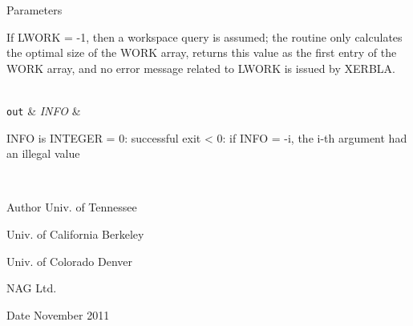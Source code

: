 \begin{DoxyParams}[1]{Parameters}
\begin{DoxyVerb}
          If LWORK = -1, then a workspace query is assumed; the routine
          only calculates the optimal size of the WORK array, returns
          this value as the first entry of the WORK array, and no error
          message related to LWORK is issued by XERBLA.\end{DoxyVerb}
\\
\hline
\mbox{\tt out}  & {\em I\+N\+F\+O} & \begin{DoxyVerb}          INFO is INTEGER
          = 0:  successful exit
          < 0:  if INFO = -i, the i-th argument had an illegal value\end{DoxyVerb}
 \\
\hline
\end{DoxyParams}
\begin{DoxyAuthor}{Author}
Univ. of Tennessee 

Univ. of California Berkeley 

Univ. of Colorado Denver 

N\+A\+G Ltd. 
\end{DoxyAuthor}
\begin{DoxyDate}{Date}
November 2011 
\end{DoxyDate}
